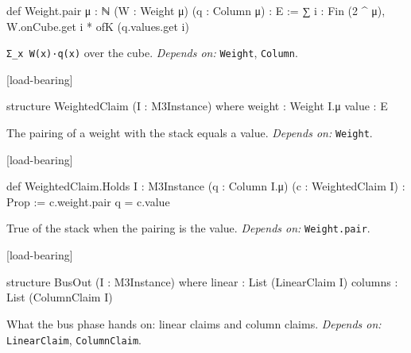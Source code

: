 \begin{leancode}
def Weight.pair {μ : ℕ} (W : Weight μ) (q : Column μ) : E :=
  ∑ i : Fin (2 ^ μ), W.onCube.get i * ofK (q.values.get i)
\end{leancode}


\texttt{Σ\_\allowbreak{}x W(\allowbreak{}x)·q(\allowbreak{}x)} over the cube. \emph{Depends on:} \texttt{Weight}, \texttt{Column}.

\par\medskip\noindent\textbf{}\hfill\textsf{\small [load-bearing]}\par\nopagebreak

\begin{leancode}
structure WeightedClaim (I : M3Instance) where
  weight : Weight I.μ
  value : E
\end{leancode}


The pairing of a weight with the stack equals a value. \emph{Depends on:} \texttt{Weight}.

\par\medskip\noindent\textbf{}\hfill\textsf{\small [load-bearing]}\par\nopagebreak

\begin{leancode}
def WeightedClaim.Holds {I : M3Instance} (q : Column I.μ) (c : WeightedClaim I) : Prop :=
  c.weight.pair q = c.value
\end{leancode}


True of the stack when the pairing is the value. \emph{Depends on:} \texttt{Weight.\allowbreak{}pair}.

\par\medskip\noindent\textbf{}\hfill\textsf{\small [load-bearing]}\par\nopagebreak

\begin{leancode}
structure BusOut (I : M3Instance) where
  linear : List (LinearClaim I)
  columns : List (ColumnClaim I)
\end{leancode}


What the bus phase hands on: linear claims and column claims. \emph{Depends on:} \texttt{LinearClaim}, \texttt{ColumnClaim}.

